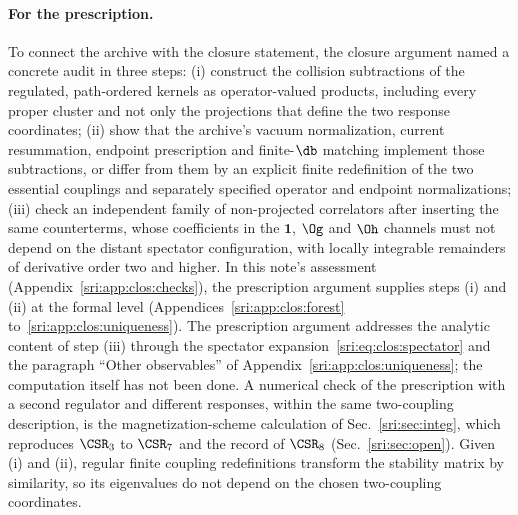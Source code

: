 \paragraph{For the prescription.} To connect the archive with the closure statement, the closure argument named a
concrete audit in three steps: (i) construct the collision subtractions of the regulated, path-ordered kernels as
operator-valued products, including every proper cluster and not only the projections that define the two response
coordinates; (ii) show that the archive's vacuum normalization, current resummation, endpoint prescription and
finite-$\db$ matching implement those subtractions, or differ from them by an explicit finite redefinition of the two
essential couplings and separately specified operator and endpoint normalizations; (iii) check an independent family of
non-projected correlators after inserting the same counterterms, whose coefficients in the $\mathbf 1$, $\Og$ and $\Oh$
channels must not depend on the distant spectator configuration, with locally integrable remainders of derivative order
two and higher. In this note's assessment (Appendix~\ref{sri:app:clos:checks}), the prescription argument supplies steps
(i) and (ii) at the formal level
(Appendices~\ref{sri:app:clos:forest} to~\ref{sri:app:clos:uniqueness}). The prescription argument addresses the analytic content of step (iii)
through the spectator expansion~\eqref{sri:eq:clos:spectator} and the paragraph ``Other observables'' of
Appendix~\ref{sri:app:clos:uniqueness}; the computation itself has not been done. A numerical check of the prescription
with a second regulator and different responses, within the same two-coupling description, is the magnetization-scheme
calculation of Sec.~\ref{sri:sec:integ}, which reproduces $\CSR_3$ to $\CSR_7$ and the record of $\CSR_8$ (Sec.~\ref{sri:sec:open}). Given (i) and (ii), regular
finite coupling redefinitions transform the stability matrix by similarity, so its eigenvalues do not depend on the
chosen two-coupling coordinates.

